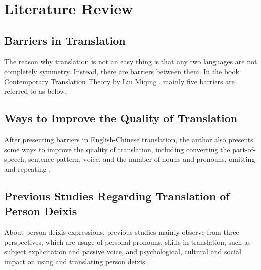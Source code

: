 \documentclass[degree=bachelor,language=english]{sysuthesis}
\begin{document}
\chapter{Literature Review}

\section{Barriers in Translation}

The reason why translation is not an easy thing is that any two languages are not completely symmetry. Instead, there are barriers between them. In the book Contemporary Translation Theory by Liu Miqing %
\citep{liu2005dangdai}, mainly five barriers are referred to as below.



\section{Ways to Improve the Quality of Translation}

After presenting barriers in English-Chinese translation, the author also presents some ways to improve the quality of translation, including converting the part-of-speech, sentence pattern, voice, and the number of nouns and pronouns, omitting and repeating %
\citep{liu2005dangdai}.



\section{Previous Studies Regarding Translation of Person Deixis }

About person deixis expressions, previous studies mainly observe from three perspectives, which are usage of personal pronouns, skills in translation, such as subject explicitation and passive voice, and psychological, cultural and social impact on using and translating person deixis.
\end{document}
